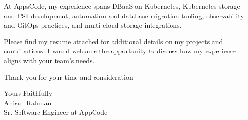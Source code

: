 \documentclass[12pt,a4]{article}
\begin{document}
At AppsCode, my experience spans DBaaS on Kubernetes, Kubernetes storage and CSI development, automation and database migration tooling, observability and GitOps practices, and multi-cloud storage integrations.

Please find my resume attached for additional details on my projects and contributions. I would welcome the opportunity to discuss how my experience aligns with your team’s needs.

Thank you for your time and consideration.\par


\vspace{0.5cm}
\raggedright
Yours Faithfully \\ Anisur Rahman \\ Sr. Software Engineer at AppCode 
\end{document}
